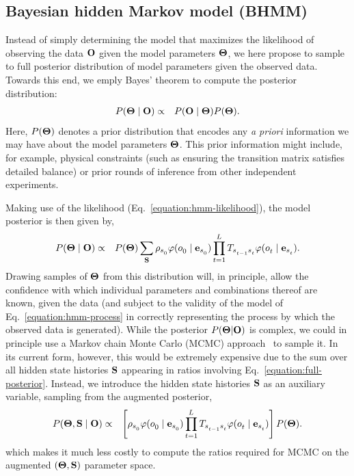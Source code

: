 \documentclass[aps,pre,twocolumn,superscriptaddress,nofootinbib,longbibliography]{revtex4-1}
\newcommand{\bfm}[1]{{\bf #1}}
\begin{document}
{%

\subsection{Bayesian hidden Markov model (BHMM)}

Instead of simply determining the model that maximizes the likelihood of observing the data $\bfm{O}$ given the model parameters $\bfm{\Theta}$, {\color{magenta} we here propose to sample to full posterior distribution of model parameters given the observed data. 
Towards this end, we emply Bayes' theorem to compute the posterior distribution:}
\begin{eqnarray}
P(\bfm{\Theta} \mid \bfm{O}) &\propto& P(\bfm{O} \mid \bfm{\Theta}) P(\bfm{\Theta}) \label{equation:bayes-theorem}.
\end{eqnarray}
Here, $P(\bfm{\Theta})$ denotes a prior distribution that encodes any \emph{a priori} information we may have about the model parameters $\bfm{\Theta}$.
This prior information might include, for example, physical constraints (such as ensuring the transition matrix satisfies detailed balance) or prior rounds of inference from other independent experiments.

Making use of the likelihood (Eq.~\ref{equation:hmm-likelihood}), the model posterior is then given by,
\begin{eqnarray}
P(\bfm{\Theta} \mid \bfm{O}) &\propto& P(\bfm{\Theta}) \sum_{\bfm{S}}\rho_{s^{}_{0}} \varphi(o^{}_{0} \mid \bfm{e}_{s^{}_{0}}) \prod_{t=1}^{L^{}} T_{s^{}_{t-1} s^{}_{t}} \varphi(o^{}_{t} \mid \bfm{e}_{s^{}_{t}})  \label{equation:full-posterior} .
\end{eqnarray}
Drawing samples of $\bfm{\Theta}$ from this distribution will, in principle, allow the confidence with which individual parameters and combinations thereof are known, given the data (and subject to the validity of the model of Eq.~\ref{equation:hmm-process} in correctly representing the process by which the observed data is generated).
While the posterior $P(\bfm{\Theta}|\bfm{O})$ is complex, we could in principle use a Markov chain Monte Carlo (MCMC) approach~\cite{jun-s-liu:mcmc} to sample it.
In its current form, however, this would be extremely expensive due to the sum over all hidden state histories $\bfm{S}$ appearing in ratios involving Eq.~\ref{equation:full-posterior}.
Instead, we introduce the hidden state histories $\bfm{S}$ as an auxiliary variable, sampling from the augmented posterior,
\begin{eqnarray}
P(\bfm{\Theta}, \bfm{S} \mid \bfm{O}) &\propto& \left[ \rho_{s^{}_{0}} \varphi(o^{}_{0} \mid \bfm{e}_{s^{}_{0}}) \prod_{t=1}^{L^{}} T_{s^{}_{t-1} s^{}_{t}} \varphi(o^{}_{t} \mid \bfm{e}_{s^{}_{t}}) \right] P(\bfm{\Theta}) . \nonumber \\\label{equation:augmented-posterior} 
\end{eqnarray}
which makes it much less costly to compute the ratios required for MCMC on the augmented $(\bfm{\Theta},\bfm{S})$ parameter space.

}
\end{document}
